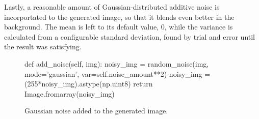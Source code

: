 Lastly, a reasonable amount of Gaussian-distributed additive noise is
incorportated to the generated image, so that it blends even better in the
background. The mean is left to its default value, 0, while the variance is
calculated from a configurable standard deviation, found by trial and error
until the result was satisfying.

\begin{figure}[h!]
    \centering
    \caption{Gaussian noise added to the generated image.}
    \begin{python}
        def add_noise(self, img):
            noisy_img = random_noise(img, mode='gaussian',
                                     var=self.noise_amount**2)
            noisy_img = (255*noisy_img).astype(np.uint8)
            return Image.fromarray(noisy_img)
    \end{python}
\end{figure}

\newpage
